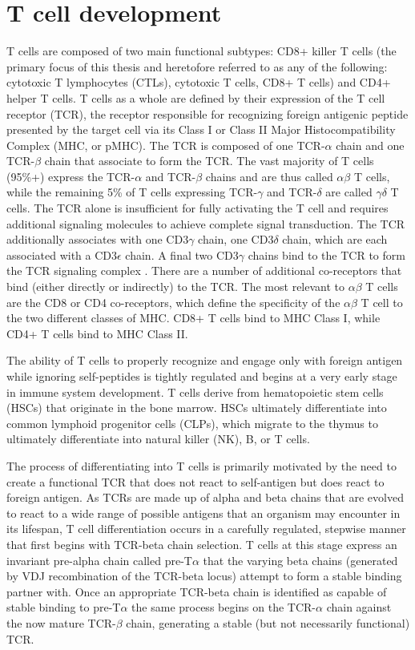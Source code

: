 \section{T cell development}
T cells are composed of two main functional subtypes: CD8+ killer T cells (the primary focus of this thesis and heretofore referred to as any of the following: cytotoxic T lymphocytes (CTLs), cytotoxic T cells, CD8+ T cells) and CD4+ helper T cells. T cells as a whole are defined by their expression of the T cell receptor (TCR), the receptor responsible for recognizing foreign antigenic peptide presented by the target cell via its Class I or Class II Major Histocompatibility Complex (MHC, or pMHC). The TCR is composed of one TCR-$\alpha$ chain and one TCR-$\beta$ chain that associate to form the TCR. The vast majority of T cells (95\%+) express the TCR-$\alpha$ and TCR-$\beta$ chains and are thus called $\alpha \beta$ T cells, while the remaining 5\% of T cells expressing TCR-$\gamma$ and TCR-$\delta$ are called $\gamma \delta$ T cells. The TCR alone is insufficient for fully activating the T cell and requires additional signaling molecules to achieve complete signal transduction. The TCR additionally associates with one CD3$\gamma$ chain, one CD3$\delta$ chain, which are each associated with a CD3$\epsilon$ chain. A final two CD3$\gamma$ chains bind to the TCR to form the TCR signaling complex \cite{Germain2002}. There are a number of additional co-receptors that bind (either directly or indirectly) to the TCR. The most relevant to $\alpha \beta$ T cells are the CD8 or CD4 co-receptors, which define the specificity of the $\alpha \beta$ T cell to the two different classes of MHC. CD8+ T cells bind to MHC Class I, while CD4+ T cells bind to MHC Class II. 

The ability of T cells to properly recognize and engage only with foreign antigen while ignoring self-peptides is tightly regulated and begins at a very early stage in immune system development. T cells derive from hematopoietic stem cells (HSCs) that originate in the bone marrow. HSCs ultimately differentiate into common lymphoid progenitor cells (CLPs), which migrate to the thymus to ultimately differentiate into natural killer (NK), B, or T cells. 

The process of differentiating into T cells is primarily motivated by the need to create a functional TCR that does not react to self-antigen but does react to foreign antigen. As TCRs are made up of alpha and beta chains that are evolved to react to a wide range of possible antigens that an organism may encounter in its lifespan, T cell differentiation occurs in a carefully regulated, stepwise manner that first begins with TCR-beta chain selection. T cells at this stage express an invariant pre-alpha chain called pre-T$\alpha$ that the varying beta chains (generated by VDJ recombination of the TCR-beta locus) attempt to form a stable binding partner with. Once an appropriate TCR-beta chain is identified as capable of stable binding to pre-T$\alpha$ the same process begins on the TCR-$\alpha$ chain against the now mature TCR-$\beta$ chain, generating a stable (but not necessarily functional) TCR.

